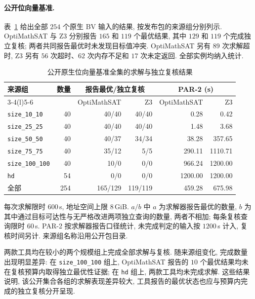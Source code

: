 
\paragraph{公开位向量基准.}
表~\ref{tab:exp-public-bv-full} 给出全部 $254$ 个原生 BV 输入的结果, 按发布包的来源组分别列示. OptiMathSAT 与 Z3 分别报告 $165$ 和 $119$ 个最优结果, 其中 $129$ 和 $119$ 个完成独立复核; 两者共同报告最优时未发现目标值冲突. OptiMathSAT 另有 $89$ 次求解超时, Z3 另有 $56$ 次超时、$62$ 次内存不足和 $17$ 次未定返回. 全部实例均纳入统计.

\begin{table}[!ht]
\centering
\caption{公开原生位向量基准全集的求解与独立复核结果}
\label{tab:exp-public-bv-full}
\small
\begin{tabular}{@{}l r rr rr@{}}
\toprule
来源组 & 数量 & \multicolumn{2}{c}{报告最优/独立复核} & \multicolumn{2}{c}{PAR-2 (s)} \\
\cmidrule(lr){3-4}\cmidrule(l){5-6}
 & & OptiMathSAT & Z3 & OptiMathSAT & Z3 \\
\midrule
\texttt{size\_10\_10} & 40 & 40/40 & 40/40 & 0.28 & 0.42 \\
\texttt{size\_25\_25} & 40 & 40/40 & 40/40 & 1.48 & 3.68 \\
\texttt{size\_50\_50} & 40 & 40/37 & 34/34 & 38.28 & 357.65 \\
\texttt{size\_75\_75} & 40 & 35/12 & 5/5 & 290.11 & 1110.71 \\
\texttt{size\_100\_100} & 40 & 10/0 & 0/0 & 966.24 & 1200.00 \\
\texttt{hd} & 54 & 0/0 & 0/0 & 1200.00 & 1200.00 \\
\midrule
全部 & 254 & 165/129 & 119/119 & 459.28 & 675.98 \\
\bottomrule
\end{tabular}
\par\smallskip
\begin{minipage}{\linewidth}\footnotesize 每次求解限时 $600$\,s, 地址空间上限 $8$\,GiB. $a/b$ 中 $a$ 为求解器报告最优的数量, $b$ 为其中通过目标可达性与无严格改进两项独立查询的数量, 两者不相加; 每条复核查询限时 $60$\,s. PAR-2 按求解器报告口径统计, 未完成判定的输入按 $1200$\,s 计入, 复核时间另计. 来源组名称沿用公开包目录.
\end{minipage}
\end{table}

两款工具均在较小的两个规模组上完成全部求解与复核. 随来源组变化, 完成数量出现明显差异: 在 \texttt{size\_100\_100} 组上, OptiMathSAT 报告的 $10$ 个最优结果均未在复核预算内取得独立最优性证据; 在 \texttt{hd} 组上, 两款工具均未完成求解. 这些结果说明, 该公开集合各组的求解表现差异较大, 工具报告的最优状态也应与预算内完成的独立复核分开呈现.
